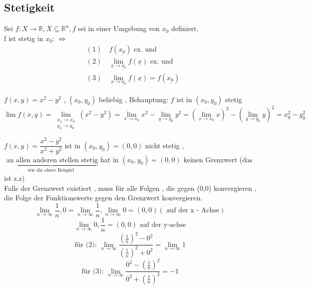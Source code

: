 \subsection{Stetigkeit}
\begin{definition}
Sei $f : X \rightarrow \mathbb{R} , X \subseteq \mathbb{R}^n , f  $ sei in einer Umgebung von $x_0$ definiert.\\
f ist stetig in $x_0$: $\Leftrightarrow$
\begin{align*}
&(1) \quad f(\underline{x_0}) \text{ ex. und }\\
&(2) \quad \lim_{\underline{x} \to \underline{x_0} }{f(\underline{x})} \text{ ex. und }\\
&(3) \quad \lim_{\underline{x} \to \underline{x_0} }{f(\underline{x})} = f(\underline{x_0})
\end{align*}
\end{definition}
\begin{example}
$f(x ,y ) = x^2 -y^2$ , $(x_0 , y_0)$ beliebig , Behauptung: $f$ ist in $(x_0 , y_0)$ stetig\\
\begin{equation}
\lim{f(x,y)} = \lim_{\substack{x_n \to x_0 \\ y_n \to y_0}}{(x^2-y^2)} =
\lim_{x \to x_0}{x^2} - \lim_{y \to y_0}{y^2} =
(\lim_{x \to x_0}{x})^2 -
(\lim_{y \to y_0}{y})^2 = x_0^2 - y_0^2
\end{equation}
\end{example}
\begin{example}
$f(x,y)= \dfrac{x^2 - y^2}{x^2 + y^2}$ ist in $(x_0,y_0) = (0,0)$ nicht stetig , $\underbrace{ \text{ an allen anderen stellen stetig}}_{\text{ wie die obere Beispiel }}$ hat in $(x_0 , y_0) = (0 ,0) $ keinen Grenzwert (das ist z.z) \\
Falls der Grenzwert existiert , muss für alle Folgen , die gegen (0,0) konvergieren , die Folge der Funktionswerte gegen den Grenzwert konvergieren.\\
\begin{equation}
\lim_{n \to \infty}{\frac{1}{n} , 0 } = \lim_{n \to \infty}{\frac{1}{n} , \lim_{n \to \infty}{0} } = (0,0) (\text{ auf der x - Achse}) 
\end{equation}
\begin{equation}
\lim_{n \to \infty}{0 , \frac{1}{n} } = (0 ,0) \text{ auf der y-achse}
\end{equation}
\begin{equation*}
\text{für (2): }
\lim_{n \to \infty}{\dfrac{(\frac{1}{n})^2-0^2}{(\frac{1}{n})^2+0^2}} = \lim_{n \to \infty}{1} 
\end{equation*}
\begin{equation*}
\text{für (3): }
\lim_{n \to \infty}{\dfrac{0^2 - (\frac{1}{n})^2}{0^2+(\frac{1}{n})^2}}=-1
\end{equation*}
\end{example}
